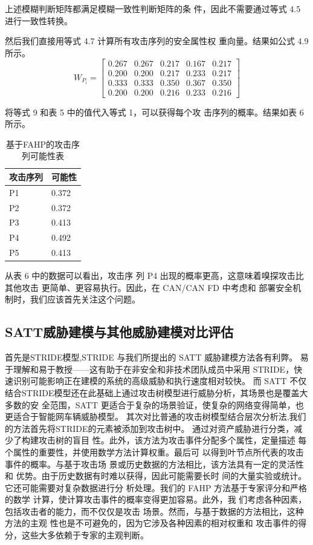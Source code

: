 上述模糊判断矩阵都满足模糊一致性判断矩阵的条
件，因此不需要通过等式 4.5 进行一致性转换。

然后我们直接用等式 4.7 计算所有攻击序列的安全属性权
重向量。结果如公式 4.9 所示。
\begin{equation}
    W_{P_i}=\left[\begin{array}{lllll}
    0.267 & 0.267 & 0.217 & 0.167 & 0.217 \\
    0.200 & 0.200 & 0.217 & 0.233 & 0.217 \\
    0.333 & 0.333 & 0.350 & 0.367 & 0.350 \\
    0.200 & 0.200 & 0.216 & 0.233 & 0.216
    \end{array}\right]
    \end{equation}

将等式 9 和表 5 中的值代入等式 1，可以获得每个攻
击序列的概率。结果如表 6 所示。
\begin{table}
  \caption{基于FAHP的攻击序列可能性表}
\begin{center}
    \begin{tabular}{|l|l}
      \hline 攻击序列 & 可能性 \\
      \hline P1 & 0.372 \\
      \hline P2 & 0.372 \\
      \hline P3 & 0.413 \\
      \hline P4 & 0.492 \\
      \hline P5 & 0.413 \\\hline
      \end{tabular}
  \end{center}
\end{table}
从表 6 中的数据可以看出，攻击序
列 P4 出现的概率更高，这意味着嗅探攻击比其他攻击
更简单、更容易执行。因此，在 CAN/CAN FD 中考虑和
部署安全机制时，我们应该首先关注这个问题。

\subsection{SATT威胁建模与其他威胁建模对比评估}
首先是STRIDE模型,STRIDE 与我们所提出的 SATT 威胁建模方法各有利弊。
易于理解和易于教授——这有助于在非安全和非技术团队成员中采用 STRIDE，快速识别可能影响正在建模的系统的高级威胁和执行速度相对较快。
而 SATT 不仅结合STRIDE模型还在此基础上通过攻击树模型进行威胁分析，其场景也是覆盖大多数的安
全范围，SATT 更适合于复杂的场景验证，使复杂的网络变得简单，也更适合于智能网车辆威胁模型。
其次对比普通的攻击树模型结合层次分析法,我们的方法首先将STRIDE的元素被添加到攻击树中。
通过对资产威胁进行分类，减少了构建攻击树的盲目
性。此外，该方法为攻击事件分配多个属性，定量描述
每个属性的重要性，并使用数学方法计算权重。最后可
以得到叶节点所代表的攻击事件的概率。与基于攻击场
景或历史数据的方法相比，该方法具有一定的灵活性和
优势。由于历史数据有时难以获得，因此可能需要长时
间的大量实验或统计。它还可能需要对复杂数据进行分
析处理。我们的 FAHP 方法基于专家评分和严格的数学
计算，使计算攻击事件的概率变得更加容易。此外，我
们考虑各种因素，包括攻击者的能力，而不仅仅是攻击
场景。然而，与基于数据的方法相比，这种方法的主观
性也是不可避免的，因为它涉及各种因素的相对权重和
攻击事件的得分，这些大多依赖于专家的主观判断。
